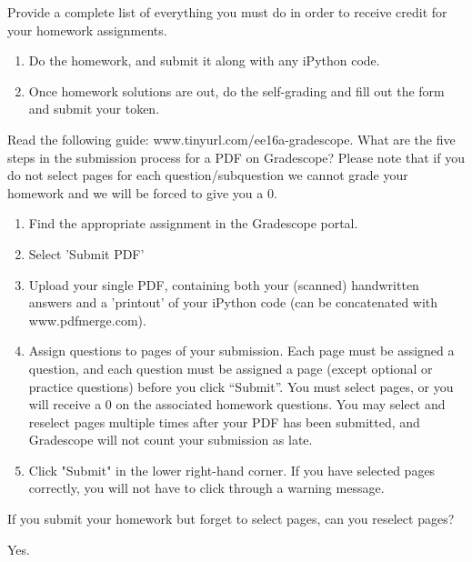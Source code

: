 \documentclass[11pt]{article}
\begin{document}
\begin{Parts}
	\Part Provide a complete list of everything you must do in order to receive credit for your homework assignments.
	\begin{Answer}
		\begin{enumerate}[1]
			\item Do the homework, and submit it along with any iPython code.
			\item Once homework solutions are out, do the self-grading and fill out the form and submit your token.
		\end{enumerate}
	\end{Answer}
	
	\Part  Read the following guide: www.tinyurl.com/ee16a-gradescope. What are the five steps in the submission process for a PDF on Gradescope? Please note that if you do not select pages for each question/subquestion we cannot grade your homework and we will be forced to give you a 0.
	\begin{Answer}
		\begin{enumerate}[1]
			\item Find the appropriate assignment in the Gradescope portal.
			\item Select 'Submit PDF'
			\item Upload your single PDF, containing both your (scanned) handwritten answers and a 'printout' of your iPython code (can be concatenated with www.pdfmerge.com).
			\item Assign questions to pages of your submission. Each page must be assigned a question, and each question must be assigned a page (except optional or practice questions) before you click “Submit”. You must select pages, or you will receive a 0 on the associated homework questions. You may select and reselect pages multiple times after your PDF has been submitted, and Gradescope will not count your submission as late.
			\item Click "Submit" in the lower right-hand corner. If you have selected pages correctly, you will not have to click through a warning message.
		\end{enumerate}
	\end{Answer}
	
	\Part If you submit your homework but forget to select pages, can you reselect pages?
	\begin{Answer}
		Yes.
	\end{Answer}


\end{Parts}
\end{document}
